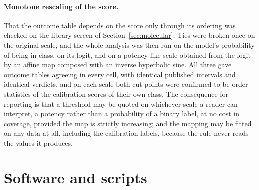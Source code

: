 \documentclass[10pt]{article}
\begin{document}
\paragraph{Monotone rescaling of the score.} That the outcome table depends on the score only through its ordering was checked on the library screen of Section~\ref{sec:molecular}. Ties were broken once on the original scale, and the whole analysis was then run on the model's probability of being in-class, on its logit, and on a potency-like scale obtained from the logit by an affine map composed with an inverse hyperbolic sine. All three gave outcome tables agreeing in every cell, with identical published intervals and identical verdicts, and on each scale both cut points were confirmed to be order statistics of the calibration scores of their own class. The consequence for reporting is that a threshold may be quoted on whichever scale a reader can interpret, a potency rather than a probability of a binary label, at no cost in coverage, provided the map is strictly increasing; and the mapping may be fitted on any data at all, including the calibration labels, because the rule never reads the values it produces.

\section{Software and scripts}
\label{sec:software}
\end{document}
